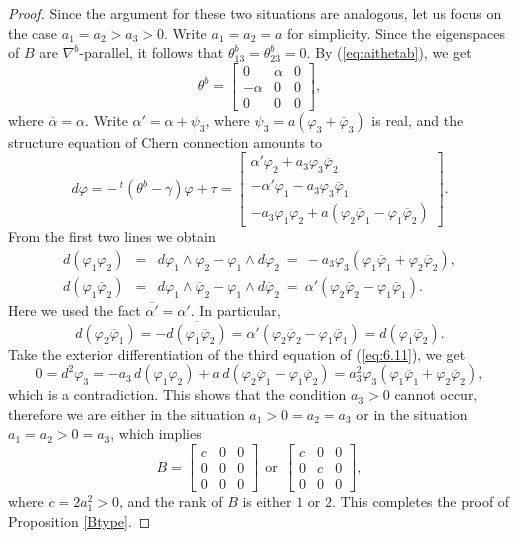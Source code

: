 \documentclass{amsart}
\numberwithin{equation}{section}
\theoremstyle{definition}
\renewcommand{\1}{\mathds{1}}
\renewcommand{\>}{\rightarrow}
\begin{document}
\begin{proof}
Since the argument for these two situations are analogous, let us focus on the case $a_1=a_2>a_3>0$. Write $a_1=a_2=a$ for simplicity.  Since the eigenspaces of $B$ are $\nabla^b$-parallel, it follows that $\theta^b_{13}=\theta^b_{23}=0$. By (\ref{eq:aithetab}), we get
$$ \theta^b =  \begin{bmatrix} 0  & \alpha & 0 \\ -\alpha & 0 & 0  \\ 0 & 0 & 0 \end{bmatrix}\!\!, $$
where $\overline{\alpha }= \alpha$. Write $\alpha' =\alpha + \psi_3$, where $\psi_3=a(\varphi_3+\overline{\varphi}_3)$ is real, and the structure equation of Chern connection amounts to
\begin{equation} \label{eq:6.11}
 d \varphi = - \,^t\!(\theta^b -\gamma ) \varphi + \tau =
\begin{bmatrix} \alpha' \varphi_2 + a_3 \varphi_3 \overline{\varphi}_2 \\ -\alpha' \varphi_1 - a_3 \varphi_3 \overline{\varphi}_1 \\  -a_3\varphi_1\varphi_2 +a (\varphi_2 \overline{\varphi}_1 - \varphi_1 \overline{\varphi}_2)  \end{bmatrix}\!\!.
\end{equation}
From the first two lines we obtain
\begin{eqnarray*}
d (\varphi_1\varphi_2) & = & d\varphi_1 \wedge \varphi_2 - \varphi_1 \wedge d\varphi_2 \ = \ -a_3 \varphi_3 (\varphi_1 \overline{\varphi}_1 + \varphi_2 \overline{\varphi}_2),\\
d (\varphi_1\overline{\varphi}_2) & = & d\varphi_1\wedge \overline{\varphi}_2 - \varphi_1\wedge d\overline{\varphi}_2 \ = \ \alpha' ( \varphi_2 \overline{\varphi}_2 - \varphi_1 \overline{\varphi}_1 ).
\end{eqnarray*}
Here we used the fact $\overline{\alpha'}=\alpha'$. In particular,
$$ d(\varphi_2 \overline{\varphi}_1 ) = - \overline{d(\varphi_1 \overline{\varphi}_2) } = \alpha ' ( \varphi_2 \overline{\varphi}_2 - \varphi_1 \overline{\varphi}_1 ) = d(\varphi_1 \overline{\varphi}_2) . $$
Take the exterior differentiation of the third equation of (\ref{eq:6.11}), we get
$$ 0 = d^2\varphi_3 = -a_3 \,d(\varphi_1\varphi_2) + a\, d(\varphi_2 \overline{\varphi}_1 - \varphi_1 \overline{\varphi}_2) = a_3^2  \varphi_3 (\varphi_1 \overline{\varphi}_1 + \varphi_2 \overline{\varphi}_2),$$
which is a contradiction. This shows that the condition $a_3>0$ cannot occur,  therefore we are  either in the situation $a_1>0=a_2=a_3$ or in the situation $a_1=a_2>0=a_3$, which implies
\[B=\begin{bmatrix} c & 0 & 0 \\ 0 & 0 & 0 \\ 0 & 0 & 0   \end{bmatrix}\ \ \text{or}\ \
\begin{bmatrix} c & 0 & 0 \\ 0 & c & 0 \\ 0 & 0 & 0   \end{bmatrix}\!\!,\]
where $c=2a_1^2>0$, and the rank of $B$ is either $1$ or $2$. This completes the proof of Proposition \ref{Btype}.
\end{proof}
\end{document}
